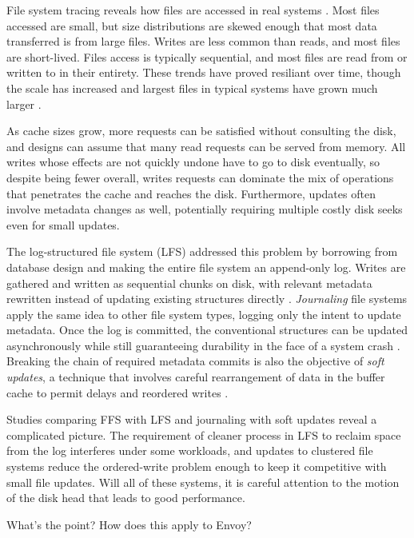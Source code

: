 File system tracing reveals how files are accessed in real systems \cite{ousterhout}. Most files accessed are small, but size distributions are skewed enough that most data transferred is from large files. Writes are less common than reads, and most files are short-lived. Files access is typically sequential, and most files are read from or written to in their entirety. These trends have proved resiliant over time, though the scale has increased and largest files in typical systems have grown much larger \cite{ruemmler,gibson98b}.

As cache sizes grow, more requests can be satisfied without consulting the disk, and designs can assume that many read requests can be served from memory. All writes whose effects are not quickly undone have to go to disk eventually, so despite being fewer overall, writes requests can dominate the mix of operations that penetrates the cache and reaches the disk. Furthermore, updates often involve metadata changes as well, potentially requiring multiple costly disk seeks even for small updates.

The log-structured file system (LFS) addressed this problem by borrowing from database design and making the entire file system an append-only log. Writes are gathered and written as sequential chunks on disk, with relevant metadata rewritten instead of updating existing structures directly \cite{rosenblum}. \emph{Journaling} file systems apply the same idea to other file system types, logging only the intent to update metadata. Once the log is committed, the conventional structures can be updated asynchronously while still guaranteeing durability in the face of a system crash \cite{hagmann,sweeney,tweedie}. Breaking the chain of required metadata commits is also the objective of \emph{soft updates}, a technique that involves careful rearrangement of data in the buffer cache to permit delays and reordered writes \cite{ganger94}.

Studies comparing FFS with LFS \cite{seltzer95} and journaling with soft updates \cite{seltzer00} reveal a complicated picture. The requirement of cleaner process in LFS to reclaim space from the log interferes under some workloads, and updates to clustered file systems reduce the ordered-write problem enough to keep it competitive with small file updates. Will all of these systems, it is careful attention to the motion of the disk head that leads to good performance.

What's the point?  How does this apply to Envoy?

